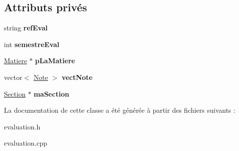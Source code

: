 \subsection*{Attributs privés}
\begin{DoxyCompactItemize}
\item 
\hypertarget{class_evaluation_aba14a650a0ee11f25805adae67627002}{string {\bfseries ref\+Eval}}\label{class_evaluation_aba14a650a0ee11f25805adae67627002}

\item 
\hypertarget{class_evaluation_afb9abd8c900951793e3a9c822a07ea62}{int {\bfseries semestre\+Eval}}\label{class_evaluation_afb9abd8c900951793e3a9c822a07ea62}

\item 
\hypertarget{class_evaluation_ad5f4d301c80076389e2ea31dfd7f09b1}{\hyperlink{class_matiere}{Matiere} $\ast$ {\bfseries p\+La\+Matiere}}\label{class_evaluation_ad5f4d301c80076389e2ea31dfd7f09b1}

\item 
\hypertarget{class_evaluation_ad26840cec05aea45af3b1164c55a7557}{vector$<$ \hyperlink{class_note}{Note} $>$ {\bfseries vect\+Note}}\label{class_evaluation_ad26840cec05aea45af3b1164c55a7557}

\item 
\hypertarget{class_evaluation_afff6a111c7954292f1b36aaa2298bac6}{\hyperlink{class_section}{Section} $\ast$ {\bfseries ma\+Section}}\label{class_evaluation_afff6a111c7954292f1b36aaa2298bac6}

\end{DoxyCompactItemize}


La documentation de cette classe a été générée à partir des fichiers suivants \+:\begin{DoxyCompactItemize}
\item 
evaluation.\+h\item 
evaluation.\+cpp\end{DoxyCompactItemize}
